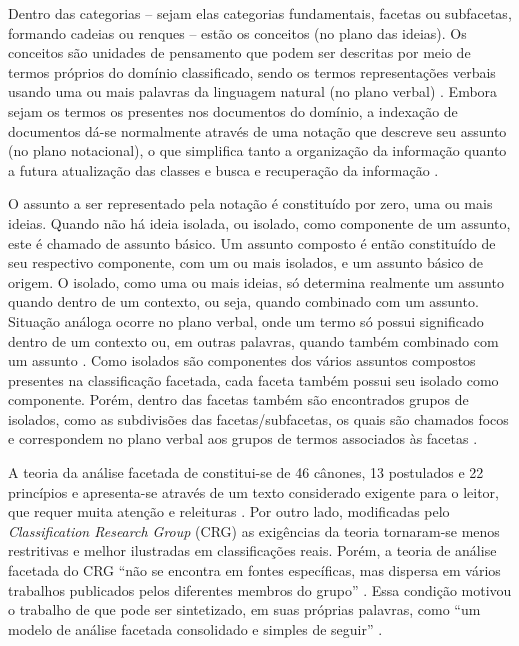 Dentro das categorias -- sejam elas categorias fundamentais, facetas ou subfacetas, formando cadeias ou renques -- estão os conceitos (no plano das ideias). Os conceitos são unidades de pensamento que podem ser descritas por meio de termos próprios do domínio classificado, sendo os termos representações verbais usando uma ou mais palavras da linguagem natural (no plano verbal) \cite[p. 62]{lima04spiteri}. Embora sejam os termos os presentes nos documentos do domínio, a indexação de documentos dá-se normalmente através de uma notação que descreve seu assunto (no plano notacional), o que simplifica tanto a organização da informação quanto a futura atualização das classes e busca e recuperação da informação \cite{spiteri98simplified}.

O assunto a ser representado pela notação é constituído por zero, uma ou mais ideias. Quando não há ideia isolada, ou isolado, como componente de um assunto, este é chamado de assunto básico. Um assunto composto é então constituído de seu respectivo componente, com um ou mais isolados, e um assunto básico de origem. O isolado, como uma ou mais ideias, só determina realmente um assunto quando dentro de um contexto, ou seja, quando combinado com um assunto. Situação análoga ocorre no plano verbal, onde um termo só possui significado dentro de um contexto ou, em outras palavras, quando também combinado com um assunto \cite{campos04}. Como isolados são componentes dos vários assuntos compostos presentes na classificação facetada, cada faceta também possui seu isolado como componente. Porém, dentro das facetas também são encontrados grupos de isolados, como as subdivisões das facetas/subfacetas, os quais são chamados focos e correspondem no plano verbal aos grupos de termos associados às facetas \cite[p. 61]{lima04spiteri}.

A teoria da análise facetada de  constitui-se de 46 cânones, 13 postulados e 22 princípios e apresenta-se através de um texto considerado exigente para o leitor, que requer muita atenção e releituras \cite{spiteri98simplified}. Por outro lado, modificadas pelo \textit{Classification Research Group} (CRG) as exigências da teoria tornaram-se menos restritivas e melhor ilustradas em classificações reais. Porém, a teoria de análise facetada do CRG ``não se encontra em fontes específicas, mas dispersa em vários trabalhos publicados pelos diferentes membros do grupo'' \cite[p. 64]{lima04spiteri}. Essa condição motivou o trabalho de  que pode ser sintetizado, em suas próprias palavras, como ``um modelo de análise facetada consolidado e simples de seguir'' \cite[Sec. 2, tradução nossa]{spiteri98simplified}.

